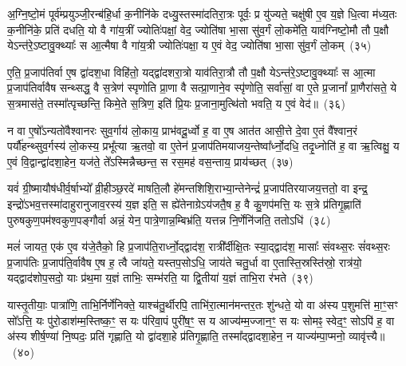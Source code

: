 अ॒ग्नि॒ष्टो॒मं पूर्व॑म्प्रयुञ्जी॒रन्ब॑हि॒र्धा क॒नीनि॑के दध्यु॒स्तस्मा॑दतिरा॒त्रः पूर्वः॒ प्र यु॑ज्यते॒ चक्षु॑षी ए॒व य॒ज्ञे धि॒त्वा म॑ध्य॒तः क॒नीनि॑के॒ प्रति॑ दधति॒ यो वै गा॑य॒त्रीं ज्योतिः॑पक्षां॒ वेद॒ ज्योति॑षा भा॒सा सु॑व॒र्गं लो॒कमे॑ति॒ याव॑ग्निष्टो॒मौ तौ प॒क्षौ ये\-ऽन्त॑रे॒\-ऽष्टावु॒क्थ्याः᳚ स आ॒त्मैषा वै गा॑य॒त्री ज्योतिः॑पक्षा॒ य ए॒वं वेद॒ ज्योति॑षा भा॒सा सु॑व॒र्गं लो॒कम्~(३५)

ए॒ति॒ प्र॒जा\-प॑तिर्वा ए॒ष द्वा॑दश॒धा विहि॑तो॒ यद्द्वा॑दशरा॒त्रो याव॑तिरा॒त्रौ तौ प॒क्षौ ये\-ऽन्त॑रे॒\-ऽष्टावु॒क्थ्याः᳚ स आ॒त्मा प्र॒जा\-प॑तिर्वावैष सन्थ्सद्ध॒ वै स॒त्रेण॑ स्पृणोति प्रा॒णा वै सत्प्रा॒णाने॒व स्पृ॑णोति॒ सर्वा॑सां॒ वा ए॒ते प्र॒जानां᳚ प्रा॒णैरा॑सते॒ ये स॒त्रमास॑ते॒ तस्मा᳚त्पृच्छन्ति॒ किमे॒ते स॒त्रिण॒ इति॑ प्रि॒यः प्र॒जाना॒मुत्थि॑तो भवति॒ य ए॒वं वेद॑॥~(३६)

{\anuvakamend[{अ॒ग्नि॒ष्टो॒मौ यथ्सु॑व॒र्गल्लों॒कं प्रि॒यः प्र॒जानां॒ पञ्च॑ च}]}%

न वा ए॒षो᳚\-ऽन्यतो॑वैश्वानरः सुव॒र्गाय॑ लो॒काय॒ प्राभ॑वदू॒र्ध्वो ह॒ वा ए॒ष आत॑त आसी॒त्ते दे॒वा ए॒तं वै᳚श्वान॒रं पर्यौ॑हन्थ्सुव॒र्गस्य॑ लो॒कस्य॒ प्रभू᳚त्या ऋ॒तवो॒ वा ए॒तेन॑ प्र॒जा\-प॑तिमयाजय॒न्तेष्वा᳚र्ध्नो॒दधि॒ तदृ॒ध्नोति॑ ह॒ वा ऋ॒त्विक्षु॒ य ए॒वं वि॒द्वान्द्वा॑दशा॒हेन॒ यज॑ते॒ ते᳚\-ऽस्मिन्नैच्छन्त॒ स रस॒मह॑ वस॒न्ताय॒ प्राय॑च्छत्~(३७)

यवं॑ ग्री॒ष्मायौष॑धीर्व॒र्\mbox{}षाभ्यो᳚ व्री॒हीञ्छ॒रदे॑ माषति॒लौ हे॑मन्तशिशि॒राभ्या॒न्तेनेन्द्रं॑ प्र॒जा\-प॑तिरयाजय॒त्ततो॒ वा इन्द्र॒ इन्द्रो॑\-ऽभव॒त्तस्मा॑दाहुरानुजाव॒रस्य॑ य॒ज्ञ इति॒ स ह्ये॑तेनाग्रे\-ऽय॑जतै॒ष ह॒ वै कु॒णप॑मत्ति॒ यः स॒त्रे प्र॑तिगृ॒ह्णाति॑ पुरुषकुण॒पम॑श्वकुण॒पङ्गौर्वा अन्नं॒ येन॒ पात्रे॒णान्न॒म्बिभ्र॑ति॒ यत्तन्न नि॒र्णेनि॑जति॒ ततो\-ऽधि॑~(३८)

मलं॑ जायत॒ एक॑ ए॒व य॑जे॒तैको॒ हि प्र॒जा\-प॑ति॒रार्ध्नो॒द्द्वाद॑श॒ रात्री᳚र्दीक्षि॒तः स्या॒द्द्वाद॑श॒ मासाः᳚ संवथ्स॒रः सं॑वथ्स॒रः प्र॒जा\-प॑तिः प्र॒जा\-प॑ति॒र्वावैष ए॒ष ह॒ त्वै जा॑यते॒ यस्तप॒सो\-ऽधि॒ जाय॑ते चतु॒र्धा वा ए॒तास्ति॒स्रस्ति॑स्रो॒ रात्र॑यो॒ यद्द्वाद॑शोप॒सदो॒ याः प्र॑थ॒मा य॒ज्ञं ताभिः॒ सम्भ॑रति॒ या द्वि॒तीया॑ य॒ज्ञं ताभि॒रा र॑भते~(३९)

यास्तृ॒तीयाः॒ पात्रा॑णि॒ ताभि॒र्निर्णे॑निक्ते॒ याश्च॑तु॒र्थीरपि॒ ताभि॑रा॒त्मान॑मन्तर॒तः शु॑न्धते॒ यो वा अ॑स्य प॒शुमत्ति॑ मा॒ꣳ॒सꣳ सो᳚\-ऽत्ति॒ यः पु॑रो॒डाश॑म्म॒स्तिष्क॒ꣳ॒ स यः प॑रिवा॒पं पुरी॑ष॒ꣳ॒ स य आज्य॑म्म॒ज्जान॒ꣳ॒ स यः सोमꣴ॒ स्वेद॒ꣳ॒ सो\-ऽपि॑ ह॒ वा अ॑स्य शीर्\mbox{}ष॒ण्या॑ नि॒ष्पदः॒ प्रति॑ गृह्णाति॒ यो द्वा॑दशा॒हे प्र॑तिगृ॒ह्णाति॒ तस्मा᳚द्द्वादशा॒हेन॒ न याज्य॑म्पा॒प्मनो॒ व्यावृ॑त्त्यै॥~(४०)

